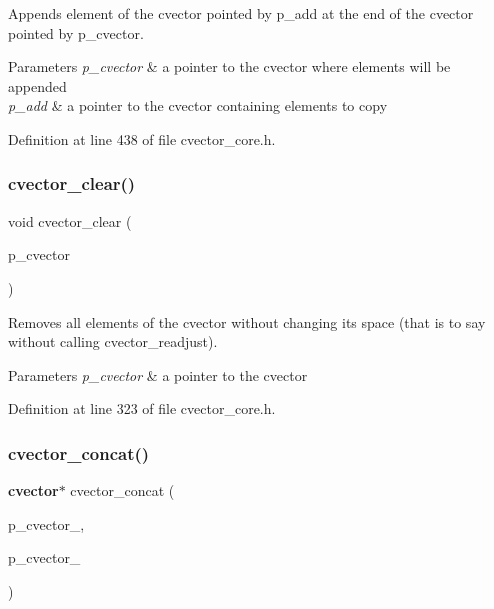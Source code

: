 Appends element of the cvector pointed by p\+\_\+add at the end of the cvector pointed by p\+\_\+cvector. 
\begin{DoxyParams}{Parameters}
{\em p\+\_\+cvector} & a pointer to the cvector where elements will be appended \\
\hline
{\em p\+\_\+add} & a pointer to the cvector containing elements to copy \\
\hline
\end{DoxyParams}


Definition at line 438 of file cvector\+\_\+core.\+h.

\mbox{\label{cvector__core_8h_aed9a4c7a1286857f5aa427938428b9f7}} 
\subsubsection{cvector\+\_\+clear()}
{\footnotesize\ttfamily void cvector\+\_\+clear (\begin{DoxyParamCaption}\item[{\textbf{ cvector} $\ast$}]{p\+\_\+cvector }\end{DoxyParamCaption})}

Removes all elements of the cvector without changing its space (that is to say without calling cvector\+\_\+readjust). 
\begin{DoxyParams}{Parameters}
{\em p\+\_\+cvector} & a pointer to the cvector \\
\hline
\end{DoxyParams}


Definition at line 323 of file cvector\+\_\+core.\+h.

\mbox{\label{cvector__core_8h_a4a0181818d231d636c9de16a95efe931}} 
\subsubsection{cvector\+\_\+concat()}
{\footnotesize\ttfamily \textbf{ cvector}$\ast$ cvector\+\_\+concat (\begin{DoxyParamCaption}\item[{\textbf{ cvector} $\ast$}]{p\+\_\+cvector\+\_,  }\item[{\textbf{ cvector} $\ast$}]{p\+\_\+cvector\+\_ }\end{DoxyParamCaption})}

